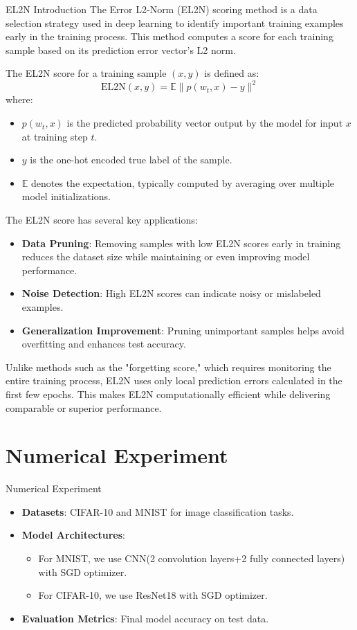 \documentclass{ctexbeamer}
\begin{document}
\begin{frame}[allowframebreaks]{EL2N Introduction}
The Error L2-Norm (EL2N) scoring method is a data selection strategy used in deep learning to identify important training examples early in the training process. This method computes a score for each training sample based on its prediction error vector's L2 norm.

The EL2N score for a training sample \((x, y)\) is defined as:
\[\text{EL2N}(x, y) = \mathbb{E} \| p(w_t, x) - y \|^2\]
where:
\begin{itemize}
  \item $p(w_t, x)$ is the predicted probability vector output by the model for input $x$ at training step $t$.
  \item $y$ is the one-hot encoded true label of the sample.
  \item $\mathbb{E}$ denotes the expectation, typically computed by averaging over multiple model initializations.
\end{itemize}

The EL2N score has several key applications:
\begin{itemize}
  \item \textbf{Data Pruning}: Removing samples with low EL2N scores early in training reduces the dataset size while maintaining or even improving model performance.
  \item \textbf{Noise Detection}: High EL2N scores can indicate noisy or mislabeled examples.
  \item \textbf{Generalization Improvement}: Pruning unimportant samples helps avoid overfitting and enhances test accuracy.
\end{itemize}

Unlike methods such as the "forgetting score," which requires monitoring the entire training process, EL2N uses only local prediction errors calculated in the first few epochs. This makes EL2N computationally efficient while delivering comparable or superior performance.
\end{frame}

\section{Numerical Experiment}
\begin{frame}{Numerical Experiment}
    \begin{itemize}
        \item \textbf{Datasets}: CIFAR-10 and MNIST for image classification tasks.
        \item \textbf{Model Architectures}: \begin{itemize}
            \item For MNIST, we use CNN(2 convolution layers+2 fully connected layers) with SGD optimizer.
            \item For CIFAR-10, we use ResNet18 with SGD optimizer.
        \end{itemize}
        \item \textbf{Evaluation Metrics}: Final model accuracy on test data.
    \end{itemize}
\end{frame}
\end{document}
